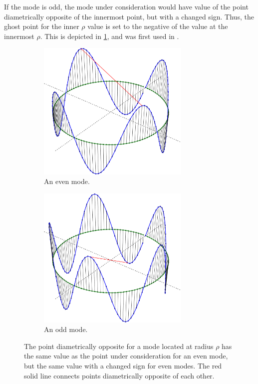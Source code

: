 If the mode is odd, the mode under consideration would have value of the point diametrically opposite of the innermost point, but with a changed sign.
Thus, the ghost point for the inner $\rho$ value is set to the negative of the value at the innermost $\rho$.
This is depicted in \cref{fig:BCLaplace}, and was first used in \cite{Naulin2008}.
%
\begin{figure}[h!]
    \centering
    \begin{subfigure}[t]{0.5\textwidth}
        \centering
        \includegraphics[width=0.8\textwidth]{fig/mode_4}
        \caption{An even mode.}
    \end{subfigure}%
    \hfill
    \begin{subfigure}[t]{0.5\textwidth}
        \centering
        \includegraphics[width=0.8\textwidth]{fig/mode_5}
        \caption{An odd mode.}
    \end{subfigure}
        \caption{The point diametrically opposite for a mode located at radius $\rho$ has the same value as the point under consideration for an even mode, but the same value with a changed sign for even modes.
            The red solid line connects points diametrically opposite of each other.}
    \label{fig:BCLaplace}
\end{figure}

